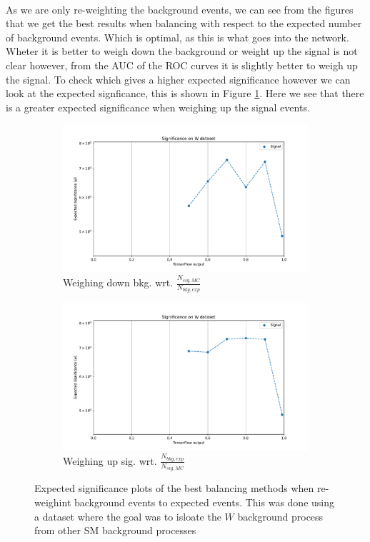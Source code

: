 \documentclass[12pt, a4paper]{book}
\begin{document}
\\As we are only re-weighting the background events, we can see from the figures that we get the best results when balancing with respect to the expected number of background events. Which is optimal, as this is what goes into the network. 
Wheter it is better to weigh down the background or weight up the signal is not clear however, from the AUC of the ROC curves it is slightly better to weigh up the signal. To check which gives a higher expected significance however we can look at 
the expected signficance, this is shown in Figure \ref{fig:WSIG}. Here we see that there is a greater expected significance when weighing up the signal events. \\
\begin{figure}[!ht]
	\centering
      \begin{subfigure}[b]{0.49\textwidth}
            \centering
            \includegraphics[width=1\textwidth]{bkg_exp/EXP_SIG.pdf}
            \caption{Weighing down bkg. wrt. $\frac{N_{sig,MC}}{N_{bkg,exp}}$ }
         \end{subfigure}
         \hfill
         \begin{subfigure}[b]{0.49\textwidth}
            \centering
            \includegraphics[width=1\textwidth]{sig_exp/EXP_SIG.pdf}
            \caption{Weighing up sig. wrt. $\frac{N_{bkg,exp}}{N_{sig,MC}}$}
         \end{subfigure}
      \caption[Significance plots for re-weighting and balancing W datset on NNs]{Expected significance plots of the best balancing methods when re-weighint background events to expected events. 
      This was done using a dataset where the goal was to isloate the $W$ background process from other SM background processes}\label{fig:WSIG}
\end{figure}
\end{document}
